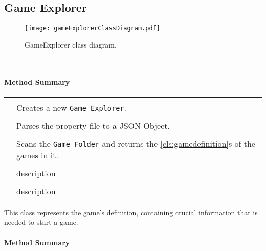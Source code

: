 \subsection{Game Explorer}

\begin{figure}[h]
	\centering
	\texttt{[image: gameExplorerClassDiagram.pdf]}
	\caption{GameExplorer class diagram.}
	\label{img:gameExplorerClassDiagram}
\end{figure}
\pagebreak

 \\

\centerdash

\paragraph*{Method Summary}
\paragraph*{}
\begin{longtable}{Lp{10cm}}
	\startmethodtable
	 \\
	& Creates a new \texttt{Game Explorer}. \\
	 \\
	& Parses the property file to a JSON Object. \\
	 \\
	& Scans the \texttt{Game Folder} and returns the \ref{cls:gamedefinition}s of the games in it. \\
	 \\
	& description \\
	 \\
	& description \\
	\hline
\end{longtable}

\pagebreak

This class represents the game's definition, containing crucial information that is needed to start a game.

\centerdash
\paragraph*{Method Summary}
